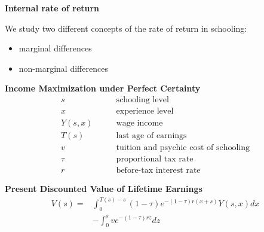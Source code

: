 \begin{frame}\begin{center}
\LARGE\textbf{Internal rate of return}
\end{center}\end{frame}
\begin{frame}
We study two different concepts of the rate of return in schooling:

\vspace{0.3cm}
\begin{itemize}\setlength\itemsep{1em}
\item marginal differences
\item non-marginal differences
\end{itemize}

\end{frame}
\begin{frame}
\textbf{Income Maximization under Perfect Certainty \nocite{Rosen.1977,Willis.1979}}
\begin{align*}
s               &\qquad\text{schooling level} \\
x               &\qquad\text{experience level} \\
Y(s, x)         &\qquad\text{wage income} \\
T(s)            &\qquad\text{last age of earnings} \\
v               &\qquad\text{tuition and psychic cost of schooling} \\
\tau            &\qquad\text{proportional tax rate} \\
r               &\qquad\text{before-tax interest rate}
\end{align*}
\end{frame}
\begin{frame}
\textbf{Present Discounted Value of Lifetime Earnings}
\begin{align*}
V(s) = & \int_0^{T(s) - s} (1 - \tau) e^{-(1 - \tau)r(x + s)} Y(s,x) dx \\
       & - \int^s_0 ve^{-(1 - \tau)rz}dz
\end{align*}
\end{frame}
